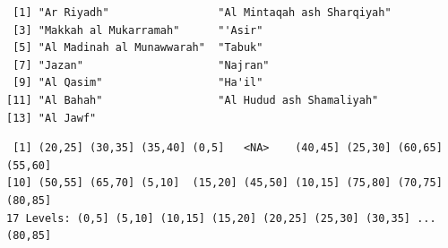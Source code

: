 \documentclass[
  letterpaper,
  DIV=11,
  numbers=noendperiod]{scrreprt}
\newenvironment{Shaded}{\begin{snugshade}}{\end{snugshade}}
\newcommand{\AttributeTok}[1]{\textcolor[rgb]{0.40,0.45,0.13}{#1}}
\newcommand{\CommentTok}[1]{\textcolor[rgb]{0.37,0.37,0.37}{#1}}
\newcommand{\DecValTok}[1]{\textcolor[rgb]{0.68,0.00,0.00}{#1}}
\newcommand{\DocumentationTok}[1]{\textcolor[rgb]{0.37,0.37,0.37}{\textit{#1}}}
\newcommand{\ErrorTok}[1]{\textcolor[rgb]{0.68,0.00,0.00}{#1}}
\newcommand{\FunctionTok}[1]{\textcolor[rgb]{0.28,0.35,0.67}{#1}}
\newcommand{\NormalTok}[1]{\textcolor[rgb]{0.00,0.23,0.31}{#1}}
\newcommand{\OtherTok}[1]{\textcolor[rgb]{0.00,0.23,0.31}{#1}}
\newcommand{\SpecialCharTok}[1]{\textcolor[rgb]{0.37,0.37,0.37}{#1}}
\newcommand{\StringTok}[1]{\textcolor[rgb]{0.13,0.47,0.30}{#1}}
\begin{document}
\begin{verbatim}
 [1] "Ar Riyadh"                 "Al Mintaqah ash Sharqiyah"
 [3] "Makkah al Mukarramah"      "'Asir"                    
 [5] "Al Madinah al Munawwarah"  "Tabuk"                    
 [7] "Jazan"                     "Najran"                   
 [9] "Al Qasim"                  "Ha'il"                    
[11] "Al Bahah"                  "Al Hudud ash Shamaliyah"  
[13] "Al Jawf"                  
\end{verbatim}

\begin{Shaded}
\end{Shaded}

\begin{verbatim}
 [1] (20,25] (30,35] (35,40] (0,5]   <NA>    (40,45] (25,30] (60,65] (55,60]
[10] (50,55] (65,70] (5,10]  (15,20] (45,50] (10,15] (75,80] (70,75] (80,85]
17 Levels: (0,5] (5,10] (10,15] (15,20] (20,25] (25,30] (30,35] ... (80,85]
\end{verbatim}

\begin{Shaded}
\end{Shaded}
\end{document}
